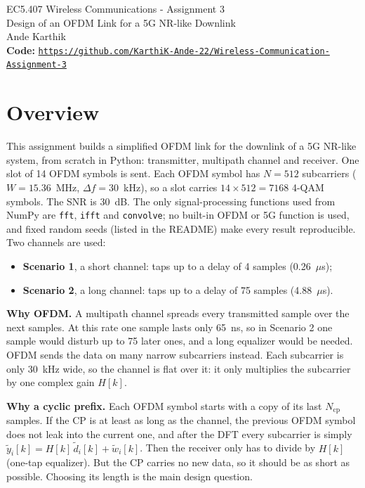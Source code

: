 \documentclass[11pt,a4paper]{article}
\newcommand{\Ncp}{N_{\mathrm{cp}}}
\newcommand{\yt}{\tilde{y}}
\newcommand{\dt}{\tilde{d}}
\newcommand{\wt}{\tilde{w}}
\begin{document}
\begin{center}
  {\LARGE EC5.407 Wireless Communications - Assignment 3}\\[6pt]
  {\large Design of an OFDM Link for a 5G NR-like Downlink}\\[12pt]
  {\large Ande Karthik }\\[6pt]
  \textbf{Code:} \texttt{\url{https://github.com/KarthiK-Ande-22/Wireless-Communication-Assignment-3}}
\end{center}

\vspace{6pt}

\section{Overview}

This assignment builds a simplified OFDM link for the downlink of a 5G NR-like system,
from scratch in Python: transmitter, multipath channel and receiver. One slot of 14 OFDM symbols is
sent. Each OFDM symbol has $N = 512$ subcarriers ($W = 15.36$~MHz, $\Delta f = 30$~kHz), so a slot
carries $14 \times 512 = 7168$ 4-QAM symbols. The SNR is 30~dB. The only signal-processing functions used from
NumPy are \texttt{fft}, \texttt{ifft} and \texttt{convolve}; no built-in OFDM or 5G function is used, and fixed random seeds
(listed in the README) make every result reproducible. Two channels are used:
\begin{itemize}
  \item \textbf{Scenario 1}, a short channel: taps up to a delay of 4 samples (0.26~$\mu$s);
  \item \textbf{Scenario 2}, a long channel: taps up to a delay of 75 samples (4.88~$\mu$s).
\end{itemize}

\textbf{Why OFDM.} A multipath channel spreads every transmitted sample over the next samples. At
this rate one sample lasts only 65~ns, so in Scenario 2 one sample would disturb up to 75 later ones,
and a long equalizer would be needed. OFDM sends the data on many narrow subcarriers instead. Each
subcarrier is only 30~kHz wide, so the channel is flat over it: it only multiplies the subcarrier by one
complex gain $H[k]$.

\textbf{Why a cyclic prefix.} Each OFDM symbol starts with a copy of its last $\Ncp$ samples. If the CP
is at least as long as the channel, the previous OFDM symbol does not leak into the current one, and
after the DFT every subcarrier is simply $\yt_i[k] = H[k]\,\dt_i[k] + \wt_i[k]$. Then the receiver only
has to divide by $H[k]$ (one-tap equalizer). But the CP carries no new data, so it should be as short as
possible. Choosing its length is the main design question.
\end{document}
